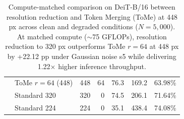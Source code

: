 \begin{table}[t]
\begin{tabular}{llrrrrr}
 & ToMe $r=64$ (448) & 448 & 64 & 76.3 & 169.2 & 63.98\% \\
 & Standard 320 & 320 & 0 & 74.5 & 206.1 & 71.64\% \\
 & Standard 224 & 224 & 0 & 35.1 & 438.4 & 74.08\% \\
\bottomrule
\end{tabular}
\caption{Compute-matched comparison on DeiT-B/16 between resolution reduction and Token Merging (ToMe) at 448 px across clean and degraded conditions ($N=5{,}000$). At matched compute ($\sim$75 GFLOPs), resolution reduction to 320 px outperforms ToMe $r=64$ at 448 px by +22.12 pp under Gaussian noise s5 while delivering 1.22$\times$ higher inference throughput.}
\label{tab:tome_matched}
\end{table}
